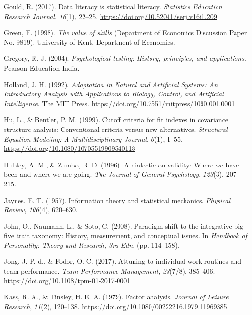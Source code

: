 \documentclass[
  12pt,
  a4paper,
  twoside]{article}
\newlength{\cslhangindent}
\newenvironment{CSLReferences}[2] %
 {\begin{list}{}{%
  \setlength{\itemindent}{0pt}
  \setlength{\leftmargin}{0pt}
  \setlength{\parsep}{0pt}
  \ifodd #1
   \setlength{\leftmargin}{\cslhangindent}
   \setlength{\itemindent}{-1\cslhangindent}
  \fi
  \setlength{\itemsep}{#2\baselineskip}}}
 {\end{list}}
\begin{document}
\begin{CSLReferences}{1}{0}
Gould, R. (2017). Data literacy is statistical literacy. \emph{Statistics Education Research Journal}, \emph{16}(1), 22--25. \url{https://doi.org/10.52041/serj.v16i1.209}

Green, F. (1998). \emph{The value of skills} (Department of Economics Discussion Paper No. 9819). University of Kent, Department of Economics.

Gregory, R. J. (2004). \emph{Psychological testing: History, principles, and applications}. Pearson Education India.

Holland, J. H. (1992). \emph{{Adaptation in Natural and Artificial Systems: An Introductory Analysis with Applications to Biology, Control, and Artificial Intelligence}}. The MIT Press. \url{https://doi.org/10.7551/mitpress/1090.001.0001}

Hu, L., \& Bentler, P. M. (1999). Cutoff criteria for fit indexes in covariance structure analysis: Conventional criteria versus new alternatives. \emph{Structural Equation Modeling: A Multidisciplinary Journal}, \emph{6}(1), 1--55. \url{https://doi.org/10.1080/10705519909540118}

Hubley, A. M., \& Zumbo, B. D. (1996). A dialectic on validity: Where we have been and where we are going. \emph{The Journal of General Psychology}, \emph{123}(3), 207--215.

Jaynes, E. T. (1957). Information theory and statistical mechanics. \emph{Physical Review}, \emph{106}(4), 620--630.

John, O., Naumann, L., \& Soto, C. (2008). Paradigm shift to the integrative big five trait taxonomy: History, measurement, and conceptual issues. In \emph{Handbook of Personality: Theory and Research, 3rd Edn.} (pp. 114--158).

Jong, J. P. d., \& Fodor, O. C. (2017). Attuning to individual work routines and team performance. \emph{Team Performance Management}, \emph{23}(7/8), 385--406. \url{https://doi.org/10.1108/tpm-01-2017-0001}

Kass, R. A., \& Tinsley, H. E. A. (1979). Factor analysis. \emph{Journal of Leisure Research}, \emph{11}(2), 120--138. \url{https://doi.org/10.1080/00222216.1979.11969385}


\end{CSLReferences}
\end{document}
